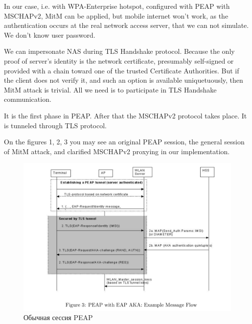\documentclass{extarticle}
\begin{document}
In our case, i.e. with WPA-Enterprise hotspot,
configured with PEAP with MSCHAPv2, MitM can be applied,
but mobile internet won't work, as the authentication occurs at the real network
access server, that we can not simulate. We don't know user password.

We can impersonate NAS during TLS Handshake protocol.
Because the only proof of server's identity is the network certificate,
presumably self-signed or provided with a chain toward one of the trusted
Certificate Authorities. But if the client does not verify it,
and such an option is available uniquetuously,
then MitM attack is trivial.
All we need is to participate in TLS Handshake communication.

It is the first phase in PEAP. After that the MSCHAPv2 protocol takes place.
It is tunneled through TLS protocol.

On the figures 1, 2, 3 you may see an original PEAP session, the general
session of MitM attack, and clarified MSCHAPv2 proxying in our implementation.

\begin{figure}
  \centering \includegraphics{res/peap-session-fig.png}
  \caption{Обычная сессия PEAP}
\end{figure}
\end{document}
